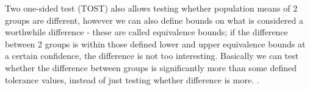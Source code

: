 Two one-sided test (TOST) also allows testing whether population means of 2 groups are different, however we can also define bounds on what is considered a worthwhile difference - these are called equivalence bounds; if the difference between 2 groups is within those defined lower and upper equivalence bounds at a certain confidence, the difference is not too interesting. Basically we can test whether the difference between groups is significantly more than some defined tolerance values, instead of just testing whether difference is more. \cite{tost}.
